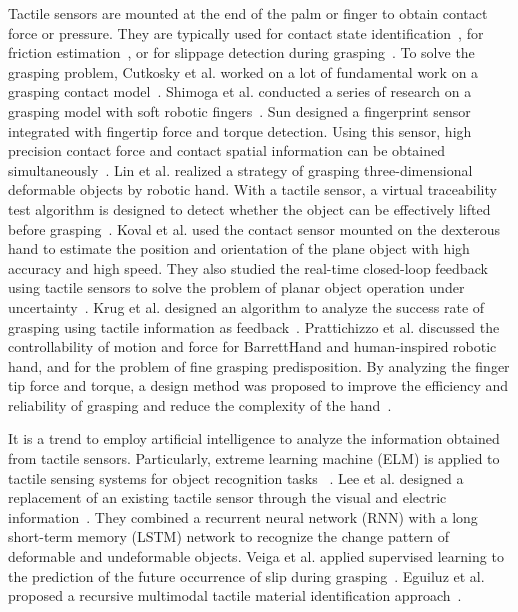 \documentclass[journal,twoside,web]{ieeecolor}
\begin{document}
Tactile sensors are mounted at the end of the palm or finger to obtain contact force or pressure. 
They are typically used for contact state identification~\cite{Chu2018,Pirozzi2018,Abdeetedal2018a}, for friction estimation~\cite{Howea,Cutkosky1986,Montano2018}, or for slippage detection during grasping~\cite{Schuermann2012,Wong2016,Rana2016,Motamedi2017,Veiga2018}.
To solve the grasping problem, Cutkosky et al. worked on a lot of fundamental work on a grasping contact model~\cite{Cutkosky1986,Cutkosky1989,Cutkosky1989a,Howe1993}.
Shimoga et al. conducted a series of research on a grasping model with soft robotic fingers~\cite{Shimogaa,Shimoga1996,Shimoga1996a}. 
Sun designed a fingerprint sensor integrated with fingertip force and torque detection. Using this sensor, high precision contact force and contact spatial information can be obtained simultaneously~\cite{Sun2011}.
Lin et al. realized a strategy of grasping three-dimensional deformable objects by robotic hand. 
With a tactile sensor, a virtual traceability test algorithm is designed to detect whether the object can be effectively lifted before grasping~\cite{Lin2015a}. 
Koval et al. used the contact sensor mounted on the dexterous hand to estimate the position and orientation of the plane object with high accuracy and high speed. 
They also studied the real-time closed-loop feedback using tactile sensors to solve the problem of planar object operation under uncertainty~\cite{Koval2015}. 
Krug et al. designed an algorithm to analyze the success rate of grasping using tactile information as feedback~\cite{Krug2016}. 
Prattichizzo et al. discussed the controllability of motion and force for BarrettHand and human-inspired robotic hand, and for the problem of fine grasping predisposition. By analyzing the finger tip force and torque, a design method was proposed to improve the efficiency and reliability of grasping and reduce the complexity of the hand~\cite{Prattichizzo2013}.

It is a trend to employ artificial intelligence to analyze the information obtained from tactile sensors.
Particularly, extreme learning machine (ELM) is applied to tactile sensing systems for object recognition tasks ~\cite{Liu2017,Zhang2018,Liu2019}.
Lee et al. designed a replacement of an existing tactile sensor through the visual and electric information~\cite{Lee2018}. They combined a recurrent neural network (RNN) with a long short-term memory (LSTM) network to recognize the change pattern of deformable and undeformable objects.
Veiga et al. applied supervised learning to the prediction of the future occurrence of slip during grasping~\cite{Veiga2018}.
Eguiluz et al. proposed a recursive multimodal tactile material identification approach~\cite{Eguiluz2018}.
\end{document}
